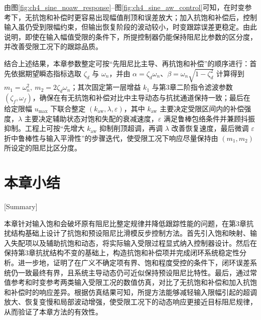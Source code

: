 \vspace{0.8em}

\noindent
由图\ref{fig:ch4_sine_noaw_response}--图\ref{fig:ch4_sine_aw_control}可知，在时变参考下，无抗饱和补偿时更容易出现幅值削顶和误差放大；加入抗饱和补偿后，控制输入虽仍受到限幅约束，但输出恢复阶段的波动较小，时变跟踪误差更稳定。由此说明，即使在输入幅值受限的条件下，所提控制器仍能保持阻尼比参数的区分度，并改善受限工况下的跟踪品质。

结合上述结果，本章参数整定可按“先阻尼比主导、再抗饱和补偿”的顺序进行：首先依据期望瞬态指标选取 $\zeta_d$ 与 $\omega_n$，并由 $\alpha=\zeta_d\omega_n$、$\beta=\omega_n\sqrt{1-\zeta_d^2}$ 计算得到 $m_1=\omega_n^2,\ m_2=2\zeta_d\omega_n$；其次固定第一层增益 $k_1$ 与第3章二阶指令滤波参数 $(\zeta_f,\omega_f)$，确保在有无抗饱和补偿对比中主导动态与抗扰通道保持一致；最后在给定限幅 $u_{\max}$ 下联合整定 $(k_{\mathrm{aw}},\lambda,\varepsilon)$，其中 $k_{\mathrm{aw}}$ 主要决定受限区间内的补偿强度，$\lambda$ 主要决定辅助状态对饱和失配的衰减速度，$\varepsilon$ 满足鲁棒包络条件并兼顾抖振抑制。工程上可按“先增大 $k_{\mathrm{aw}}$ 抑制削顶超调，再调 $\lambda$ 改善恢复速度，最后微调 $\varepsilon$ 折中鲁棒性与输入平滑性”的步骤迭代，使受限工况下响应尽量保持由 $(m_1,m_2)$ 所设定的阻尼比区分度。
\FloatBarrier

\section{本章小结}[Summary]

本章针对输入饱和会破坏原有阻尼比整定规律并降低跟踪性能的问题，在第3章抗扰结构基础上设计了抗饱和预设阻尼比滑模反步控制方法。首先引入饱和映射、输入失配项以及辅助抗饱和动态，将实际输入受限过程显式纳入控制器设计。然后在保持第3章抗扰结构不变的基础上，构造抗饱和补偿项并完成闭环系统稳定性分析。进一步地，证明了在广义不确定项有界、饱和程度受控的条件下，闭环误差系统仍一致最终有界，且系统主导动态仍可近似保持预设阻尼比特性。最后，通过常值参考和时变参考两类输入受限工况的数值仿真，对比了无抗饱和补偿和加入抗饱和补偿时的响应差异。根据仿真结果可知，所提方法能够减轻输入限幅引起的超调放大、恢复变慢和局部波动增强，使受限工况下的动态响应更接近目标阻尼规律，从而验证了本章方法的有效性。

